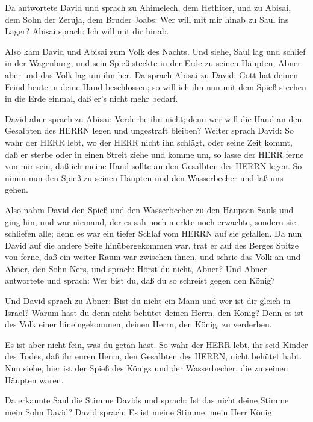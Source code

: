  Da antwortete David und sprach zu Ahimelech, dem Hethiter,
und zu Abisai, dem Sohn der Zeruja, dem Bruder Joabs: Wer will mit mir
hinab zu Saul ins Lager? Abisai sprach: Ich will mit dir hinab.

 Also kam David und Abisai zum Volk des Nachts. Und siehe,
Saul lag und schlief in der Wagenburg, und sein Spieß steckte in der
Erde zu seinen Häupten; Abner aber und das Volk lag um ihn her.
 Da sprach Abisai zu David: Gott hat deinen Feind heute in
deine Hand beschlossen; so will ich ihn nun mit dem Spieß stechen in die
Erde einmal, daß er's nicht mehr bedarf.

 David aber sprach zu Abisai: Verderbe ihn nicht; denn wer
will die Hand an den Gesalbten des HERRN legen und ungestraft bleiben?
 Weiter sprach David: So wahr der HERR lebt, wo der HERR
nicht ihn schlägt, oder seine Zeit kommt, daß er sterbe oder in einen
Streit ziehe und komme um,  so lasse der HERR ferne von mir
sein, daß ich meine Hand sollte an den Gesalbten des HERRN legen. So
nimm nun den Spieß zu seinen Häupten und den Wasserbecher und laß uns
gehen.

 Also nahm David den Spieß und den Wasserbecher zu den
Häupten Sauls und ging hin, und war niemand, der es sah noch merkte noch
erwachte, sondern sie schliefen alle; denn es war ein tiefer Schlaf vom
HERRN auf sie gefallen.  Da nun David auf die andere Seite
hinübergekommen war, trat er auf des Berges Spitze von ferne, daß ein
weiter Raum war zwischen ihnen,  und schrie das Volk an und
Abner, den Sohn Ners, und sprach: Hörst du nicht, Abner? Und Abner
antwortete und sprach: Wer bist du, daß du so schreist gegen den König?

 Und David sprach zu Abner: Bist du nicht ein Mann und wer
ist dir gleich in Israel? Warum hast du denn nicht behütet deinen Herrn,
den König? Denn es ist des Volk einer hineingekommen, deinen Herrn, den
König, zu verderben.

 Es ist aber nicht fein, was du getan hast. So wahr der
HERR lebt, ihr seid Kinder des Todes, daß ihr euren Herrn, den Gesalbten
des HERRN, nicht behütet habt. Nun siehe, hier ist der Spieß des Königs
und der Wasserbecher, die zu seinen Häupten waren.

 Da erkannte Saul die Stimme Davids und sprach: Ist das
nicht deine Stimme mein Sohn David? David sprach: Es ist meine Stimme,
mein Herr König.

